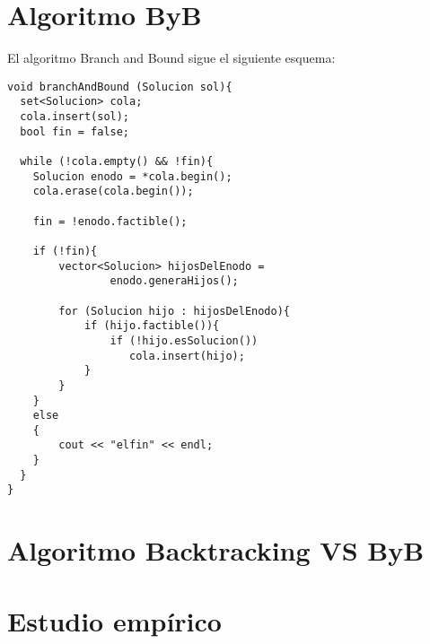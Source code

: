 \documentclass{article}
\begin{document}
	\section{Algoritmo ByB}
	El algoritmo Branch and Bound sigue el siguiente esquema:
	
	\begin{lstlisting}
void branchAndBound (Solucion sol){
  set<Solucion> cola;
  cola.insert(sol);
  bool fin = false;

  while (!cola.empty() && !fin){
	Solucion enodo = *cola.begin();
	cola.erase(cola.begin());

	fin = !enodo.factible();

	if (!fin){
		vector<Solucion> hijosDelEnodo = 
				enodo.generaHijos();

		for (Solucion hijo : hijosDelEnodo){
			if (hijo.factible()){
				if (!hijo.esSolucion())
				   cola.insert(hijo);
			}
		}
	}
	else
	{
		cout << "elfin" << endl;
	}
  }
}
	\end{lstlisting}
	
	\section{Algoritmo Backtracking VS ByB}
	\section{Estudio empírico}
\end{document}
